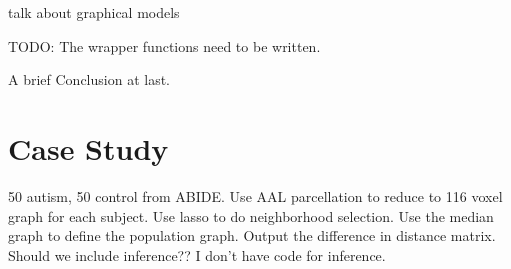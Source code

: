 \documentclass{nature}
\begin{document}
{\color{red}talk about graphical models}

{\color{red}TODO: The wrapper functions need to be written.}
 
A brief Conclusion at last.

\section{Case Study}

{\color{red}50 autism, 50 control from ABIDE. Use AAL parcellation to reduce to
116 voxel graph
for each subject. Use lasso to do neighborhood selection. Use the median graph
to
define the population graph. Output the difference in distance matrix. Should we
include inference?? I don't have code for inference.}

\newpage
\appendix
\end{document}
